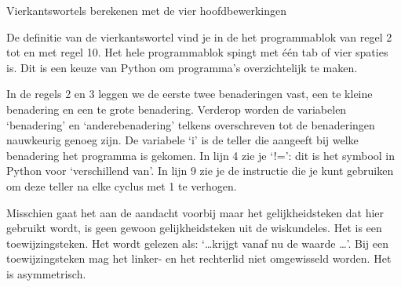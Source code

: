 \begin{lesactiviteit}{Vierkantswortels berekenen met de vier hoofdbewerkingen}
    \medskip
    
    De definitie van de vierkantswortel vind je in de het programmablok van regel 2 tot en met regel 10. Het hele programmablok spingt met één tab of vier spaties is. Dit is een keuze van Python om programma's overzichtelijk te maken.
    
    In de regels 2 en 3 leggen we de eerste twee benaderingen vast, een te kleine benadering en een te grote benadering. Verderop worden de variabelen `benadering' en `anderebenadering' telkens overschreven tot de benaderingen nauwkeurig genoeg zijn. De variabele `i' is de teller die aangeeft bij welke benadering het programma is gekomen. In lijn 4 zie je `!=': dit is het symbool in Python voor `verschillend van'. In lijn 9 zie je de instructie die je kunt gebruiken om deze teller na elke cyclus met 1 te verhogen.
    
    
    \begin{vraagenantwoord}[resume]
        
        \end{vraagenantwoord}
        
        Misschien gaat het aan de aandacht voorbij maar het gelijkheidsteken dat hier gebruikt wordt, is geen gewoon gelijkheidsteken uit de wiskundeles. Het is een toewijzingsteken. Het wordt gelezen als: `\dots krijgt vanaf nu de waarde \dots'. Bij een toewijzingsteken mag het linker- en het rechterlid niet omgewisseld worden. Het is asymmetrisch.
        
        \begin{vraagenantwoord} [resume]
            

\end{vraagenantwoord}
\end{lesactiviteit}
